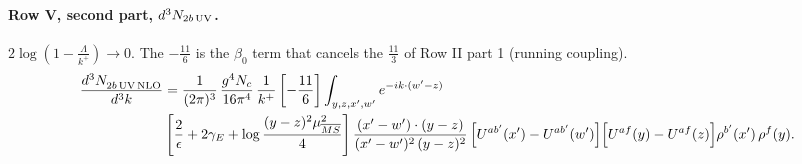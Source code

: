 \documentclass[10pt]{article}
\numberwithin{equation}{section}
\begin{document}
\paragraph{Row V, second part, $d^3N_{2b\,\rm UV}$.}
$2\log(1-\frac{\Lambda}{k^+})\to0$. The $-\frac{11}{6}$ is the $\beta_0$ term that cancels the $\frac{11}{3}$ of Row II part 1 (running coupling).
\begin{align}
\frac{d^{3}N_{2b\,\rm UV\, NLO}^{\rm}}{d^{3}k} & =  \frac{1}{(2\pi)^{3}}\,\frac{g^{4}N_{c}}{16\pi^{4}}\,\frac{1}{k^{+}}
\left[-\frac{11}{6}\right]\int_{y,z,x',w'}e^{-ik\cdot(w'-z)}\notag \\ & \left[\frac{2}{\epsilon}+2\gamma_{E}+\log\frac{(y-z)^{2}\mu^{2}_{\overline{MS}}}{4}\right]
\frac{(x'-w')\cdot(y-z)}{(x'-w')^{2}\,(y-z)^{2}}\, \Big[U^{ab'}(x')-U^{ab'}(w')\Big]\Big[U^{af}(y)-U^{af}(z)\Big]\rho^{b'}(x')\,\rho^{f}(y). \label{eq:R:G1V2bUV}
\end{align}
\end{document}
